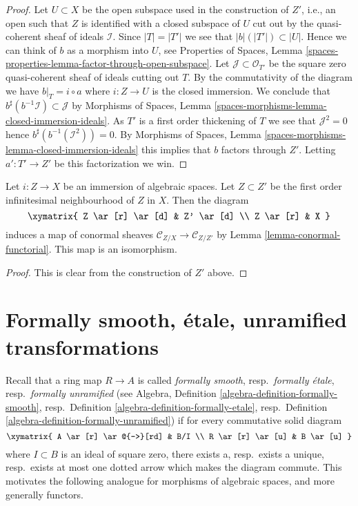 \begin{proof}
Let $U \subset X$ be the open subspace used in the construction of $Z'$,
i.e., an open such that $Z$ is identified with a closed subspace of $U$
cut out by the quasi-coherent sheaf of ideals $\mathcal{I}$.
Since $|T| = |T'|$ we see that $|b|(|T'|) \subset |U|$. Hence we can
think of $b$ as a morphism into $U$, see
Properties of Spaces,
Lemma \ref{spaces-properties-lemma-factor-through-open-subspace}.
Let $\mathcal{J} \subset \mathcal{O}_{T'}$
be the square zero quasi-coherent sheaf of ideals cutting out $T$.
By the commutativity of the diagram we have $b|_T = i \circ a$ where
$i : Z \to U$ is the closed immersion. We conclude that
$b^\sharp(b^{-1}\mathcal{I}) \subset \mathcal{J}$ by
Morphisms of Spaces,
Lemma \ref{spaces-morphisms-lemma-closed-immersion-ideals}.
As $T'$ is a first order thickening of $T$ we see that $\mathcal{J}^2 = 0$
hence $b^\sharp(b^{-1}(\mathcal{I}^2)) = 0$. By
Morphisms of Spaces, Lemma \ref{spaces-morphisms-lemma-closed-immersion-ideals}
this implies that $b$ factors through $Z'$. Letting $a' : T' \to Z'$
be this factorization we win.
\end{proof}

\begin{lemma}
\label{lemma-infinitesimal-neighbourhood-conormal}
Let $i : Z \to X$ be an immersion of algebraic spaces.
Let $Z \subset Z'$ be the first order infinitesimal neighbourhood
of $Z$ in $X$. Then the diagram
$$
\xymatrix{
Z \ar[r] \ar[d] & Z' \ar[d] \\
Z \ar[r] & X
}
$$
induces a map of conormal sheaves
$\mathcal{C}_{Z/X} \to \mathcal{C}_{Z/Z'}$ by
Lemma \ref{lemma-conormal-functorial}.
This map is an isomorphism.
\end{lemma}

\begin{proof}
This is clear from the construction of $Z'$ above.
\end{proof}





\section{Formally smooth, \'etale, unramified transformations}
\label{section-formally-smooth-etale-unramified}

\noindent
Recall that a ring map $R \to A$ is called
{\it formally smooth}, resp.\ {\it formally \'etale},
resp.\ {\it formally unramified}
(see Algebra, Definition \ref{algebra-definition-formally-smooth},
resp.\ Definition \ref{algebra-definition-formally-etale},
resp.\ Definition \ref{algebra-definition-formally-unramified})
if for every commutative solid diagram
$$
\xymatrix{
A \ar[r] \ar@{-->}[rd] & B/I \\
R \ar[r] \ar[u] & B \ar[u]
}
$$
where $I \subset B$ is an ideal of square zero, there
exists a, resp.\ exists a unique, resp.\ exists at most one dotted
arrow which makes the diagram commute. This motivates
the following analogue for morphisms of algebraic spaces, and more
generally functors.

